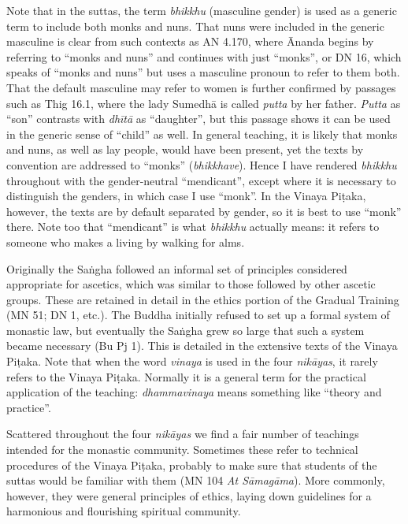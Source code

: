 \documentclass[12pt,openany]{book}%
\begin{document}
Note that in the suttas, the term \textit{bhikkhu} (masculine gender) is used as a generic term to include both monks and nuns. That nuns were included in the generic masculine is clear from such contexts as AN 4.170, where Ānanda begins by referring to “monks and nuns” and continues with just “monks”, or DN 16, which speaks of “monks and nuns” but uses a masculine pronoun to refer to them both. That the default masculine may refer to women is further confirmed by passages such as Thig 16.1, where the lady \textsanskrit{Sumedhā} is called \textit{putta} by her father. \textit{Putta} as “son” contrasts with \textit{\textsanskrit{dhītā}} as “daughter”, but this passage shows it can be used in the generic sense of “child” as well. In general teaching, it is likely that monks and nuns, as well as lay people, would have been present, yet the texts by convention are addressed to “monks” (\textit{bhikkhave}). Hence I have rendered \textit{bhikkhu} throughout with the gender-neutral “mendicant”, except where it is necessary to distinguish the genders, in which case I use “monk”. In the Vinaya \textsanskrit{Piṭaka}, however, the texts are by default separated by gender, so it is best to use “monk” there. Note too that “mendicant” is what \textit{bhikkhu} actually means: it refers to someone who makes a living by walking for alms.

Originally the \textsanskrit{Saṅgha} followed an informal set of principles considered appropriate for ascetics, which was similar to those followed by other ascetic groups. These are retained in detail in the ethics portion of the Gradual Training (MN 51; DN 1, etc.). The Buddha initially refused to set up a formal system of monastic law, but eventually the \textsanskrit{Saṅgha} grew so large that such a system became necessary (Bu Pj 1). This is detailed in the extensive texts of the Vinaya \textsanskrit{Piṭaka}. Note that when the word \textit{vinaya} is used in the four \textit{\textsanskrit{nikāyas}}, it rarely refers to the Vinaya \textsanskrit{Piṭaka}. Normally it is a general term for the practical application of the teaching: \textit{dhammavinaya} means something like “theory and practice”.

Scattered throughout the four \textit{\textsanskrit{nikāyas}} we find a fair number of teachings intended for the monastic community. Sometimes these refer to technical procedures of the Vinaya \textsanskrit{Piṭaka}, probably to make sure that students of the suttas would be familiar with them (MN 104 \textit{At \textsanskrit{Sāmagāma}}). More commonly, however, they were general principles of ethics, laying down guidelines for a harmonious and flourishing spiritual community.
\end{document}
